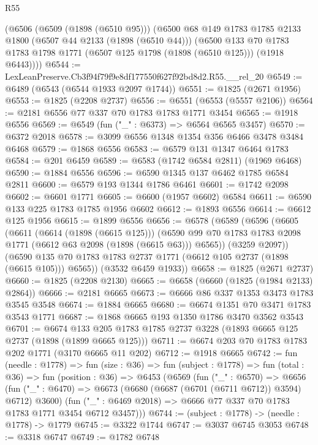 \begin{lexlean}{R55}
\begin{coremodule}
    (@6506
      (@6509 (@1898 (@6510 @95)))
      (@6500
        @68
        @149
        @1783
        @1785
        @2133
        @1800
        (@6507 @44 @2133 (@1898 (@6510 @44)))
        (@6500
          @133
          @70
          @1783
          @1783
          @1798
          @1771
          (@6507 @125 @1798 (@1898 (@6510 @125)))
          (@1918 @6443))))
@6544 := LexLeanPreserve.Cb3f94f79f9e8df177550f627f92bd8d2.R55.__rel_20
@6549 := @6489 (@6543 (@6544 @1933 @2097 @1744))
@6551 := @1825 (@2671 @1956)
@6553 := @1825 (@2208 @2737)
@6556 := @6551 (@6553 (@5557 @2106))
@6564 := @2181 @6556 @77 @337 @70 @1783 @1783 @1771 @3454
@6565 := @1918 @6556
@6569 := @6549 (fun ("_" : @6373) => @6564 @6565 @3457)
@6570 := @6372 @2018
@6578 := @3099 @6556 @1348 @1354 @356 @6466 @3478 @3484 @6468
@6579 := @1868 @6556
@6583 := @6579 @131 @1347 @6464 @1783
@6584 := @201 @6459
@6589 := @6583 (@1742 @6584 @2811) (@1969 @6468)
@6590 := @1884 @6556
@6596 := @6590 @1345 @137 @6462 @1785 @6584 @2811
@6600 := @6579 @193 @1344 @1786 @6461
@6601 := @1742 @2098
@6602 := @6601 @1771
@6605 := @6600 (@1957 @6602) @6584
@6611 := @6590 @133 @225 @1783 @1785 @1956 @6602
@6612 := @1893 @6556
@6614 := @6612 @125 @1956
@6615 := @1899 @6556
@6656 := @6578
    (@6589
      (@6596
        (@6605
          (@6611
            (@6614 (@1898 (@6615 @125)))
            (@6590 @99 @70 @1783 @1783 @2098 @1771 (@6612 @63 @2098 (@1898 (@6615 @63))) @6565))
          (@3259 @2097))
        (@6590 @135 @70 @1783 @1783 @2737 @1771 (@6612 @105 @2737 (@1898 (@6615 @105))) @6565))
      (@3532 @6459 @1933))
@6658 := @1825 (@2671 @2737)
@6660 := @1825 (@2208 @2130)
@6665 := @6658 (@6660 (@1825 (@1984 @2133) @2864))
@6666 := @2181 @6665
@6673 := @6666 @86 @337 @1353 @3473 @1783 @3545 @3548
@6674 := @1884 @6665
@6680 := @6674 @1351 @70 @3471 @1783 @3543 @1771
@6687 := @1868 @6665 @193 @1350 @1786 @3470 @3562 @3543
@6701 := @6674 @133 @205 @1783 @1785 @2737 @3228 (@1893 @6665 @125 @2737 (@1898 (@1899 @6665 @125)))
@6711 := @6674 @203 @70 @1783 @1783 @202 @1771 (@3170 @6665 @11 @202)
@6712 := @1918 @6665
@6742 := fun (needle : @1778) =>
  fun (size : @36) =>
  fun (subject : @1778) =>
  fun (total : @36) =>
  fun (position : @36) =>
  @6453
    (@6569
      (fun ("_" : @6570) =>
      @6656
        (fun ("_" : @6470) => @6673 (@6680 (@6687 (@6701 (@6711 @6712)) @3594) @6712) @3600)
        (fun ("_" : @6469 @2018) => @6666 @77 @337 @70 @1783 @1783 @1771 @3454 @6712 @3457)))
@6744 := (subject : @1778) -> (needle : @1778) -> @1779
@6745 := @3322 @1744
@6747 := @3037 @6745 @3053
@6748 := @3318 @6747
@6749 := @1782 @6748

\end{coremodule}
\end{lexlean}
